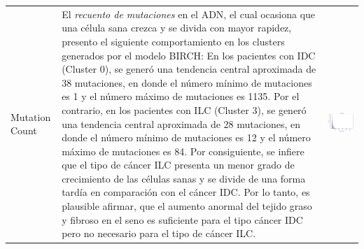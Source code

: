 \begin{table}
	\footnotesize
	\begin{threeparttable}
		\begin{tabular}{p{2.5cm} p{7cm} p{6.5cm}} \toprule
			Mutation Count
			&  El \textit{recuento de mutaciones} en el ADN, el cual ocasiona que una célula sana crezca y se divida con mayor rapidez, presento el siguiente comportamiento en los clusters generados por el modelo BIRCH:  En los pacientes con IDC (Cluster 0), se generó una tendencia central aproximada de 38 mutaciones, en donde el número mínimo de mutaciones es 1 y el número máximo de mutaciones es 1135. Por el contrario, en los pacientes con ILC (Cluster 3), se generó una tendencia central aproximada de 28 mutaciones, en donde el número mínimo de mutaciones es 12 y el número máximo de mutaciones es 84. Por consiguiente, se infiere que el tipo de cáncer ILC presenta un menor grado de crecimiento de las células sanas y se divide de una forma tardía en comparación con el cáncer IDC. Por lo tanto, es plausible afirmar, que el aumento anormal del tejido graso y fibroso en el seno es suficiente para el tipo cáncer IDC pero no necesario para el tipo de cáncer ILC. 
			& 
			\begin{center}\includegraphics[width=1\linewidth]{NOTEBOOK/IMAGENES_BIRCH_CLUSTERING/8_Cluster_0_mutation_count}\end{center}

\end{tabular}
\end{threeparttable}
\end{table}
